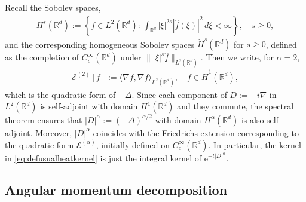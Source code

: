 \documentclass[12pt,reqno]{amsart}
\theoremstyle{definition}
\theoremstyle{remark}
\numberwithin{equation}{section}
\newcommand{\1}{\mathbbm{1}}
\newcommand{\R}{\mathbb{R}}
\def\ce{\mathcal{E}}
\newcommand{\me}[1]{\mathrm{e}^{#1}}
\begin{document}
Recall the Sobolev spaces,
\begin{align}
  H^s(\R^d) := \left\{f\in L^2(\R^d):\,
  \int_{\R^d} |\xi|^{2s} |\hat f(\xi)|^2\,d\xi < \infty\right\}, \quad s\geq0,
\end{align}\index{$H^s(\R^d)$}%
and the corresponding homogeneous Sobolev spaces $\dot H^s(\R^d)$\index{$\dot H^{s}(\R^d)$} for $s\geq0$, defined as the completion of $C_c^\infty(\R^d)$ under $\||\xi|^s \hat f\|_{L^2(\R^d)}$. Then we write, for $\alpha=2$,
\begin{align}
  \label{eq:deflaplacequadform}
  \ce^{(2)}[f]:=\langle\nabla f,\nabla f\rangle_{L^2(\R^d)}, \quad f\in \dot H^1(\R^d),
\end{align}\index{$\ce^{(2)}$}which is the quadratic form of $-\Delta$. Since each component of $D:=-i\nabla$ in $L^2(\R^d)$ is self-adjoint with domain $H^1(\R^d)$ and they commute, the spectral theorem ensures that $|D|^\alpha:=(-\Delta)^{\alpha/2}$ with domain $H^\alpha(\R^d)$ is also self-adjoint. Moreover, $|D|^\alpha$ coincides with the Friedrichs extension corresponding to the quadratic form $\ce^{(\alpha)}$, initially defined on $C_c^\infty(\R^d)$. In particular, the kernel in \eqref{eq:defusualheatkernel} is just the integral kernel of $\me{-t|D|^\alpha}$.



\subsection{Angular momentum decomposition}
\label{ss:angularmomenta}
\end{document}
